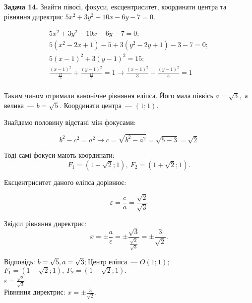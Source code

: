 \documentclass[14pt,draft]{extreport}
\begin{document}
\bigskip \textbf{Задача 14.} Знайти півосі, фокуси, ексцентриситет,
координати центра та рівняння директрис $5x^2+3y^2-10x-6y-7=0.$\bigskip

%
\begin{equation}
\begin{aligned}
5x^2+3y^2-10x-6y-7=0;\\
	5(x^2-2x+1)-5+3(y^2-2y+1)-3-7=0;\\
	5(x-1)^2+3(y-1)^2=15;\\
	\frac{(x-1)^2}{\frac{15}{5}}+\frac{(y-1)^2}{\frac{15}{3}}=1
	\rightarrow
	\frac{(x-1)^2}{3}+\frac{(y-1)^2}{5}=1\\
\end{aligned}
\end{equation}

Таким чином отримали канонічне рівняння еліпса.
Його мала піввісь $a=\sqrt{3},$
а велика~--- $b=\sqrt{5}$. Координати центра~---
$(1;1).$

Знайдемо половину відстані між фокусами:

\begin{equation}
	b^2-c^2=a^2\to c=\sqrt{b^2-a^2}=\sqrt{5-3}=\sqrt{2}
\end{equation}

Тоді самі фокуси мають координати:
$$F_1=(1-\sqrt{2};1),~F_2=(1+\sqrt{2};1).$$

Ексцентриситет даного еліпса дорівнює:

\begin{equation}
	\varepsilon=\frac{c}{a}=\frac{\sqrt{2}}{\sqrt{3}}
\end{equation}


Звідси рівняння директрис:
\begin{equation}
	x=\pm\frac{a}{\varepsilon}=\pm\frac{\sqrt{3}}
	{\frac{\sqrt{2}}{\sqrt{3}}}=\pm\frac{3}{\sqrt{2}}.
\end{equation}

\null\hfill
\begin{boxedminipage}{0.4\textwidth}
	Відповідь: $b=\sqrt{5}, a=\sqrt{3};\\
	$Центр еліпса~--- $O(1;1);$\\
	$F_1=(1-\sqrt{2};1),~F_2=(1+\sqrt{2};1).$\\
	$\varepsilon=\frac{\sqrt{2}}{\sqrt{3}}$\\
	Рівняння директрис: $x=\pm\frac{3}{\sqrt{2}}.$
\end{boxedminipage}
\end{document}
